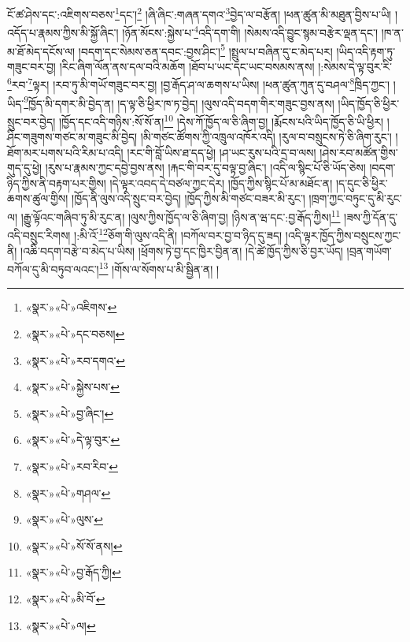 ངོ་ཚ་ཤེས་དང་:འཇིགས་བཅས་\footnote{«སྣར་»«པེ་»འཇིགས་}དང་།\footnote{«སྣར་»«པེ་»དང་བཅས།} །ཞི་ཞིང་:གཞན་དགའ་\footnote{«སྣར་»«པེ་»རབ་དགའ་}བྱེད་ལ་བརྩོན། །ཕན་ཚུན་མི་མཐུན་བྱིས་པ་ཡི། །འདོད་པ་རྣམས་ཀྱིས་མི་སྐྱོ་ཞིང་། །ཉོན་མོངས་:སྐྱེས་པ་\footnote{«སྣར་»«པེ་»སྐྱེས་པས་}འདི་དག་གི། །སེམས་འདི་བྱུང་སྙམ་བརྩེར་ལྡན་དང་། །ཁ་ན་མ་ཐོ་མེད་དངོས་ལ། །བདག་དང་སེམས་ཅན་དབང་:བྱས་ཤིང་།\footnote{«སྣར་»«པེ་»བྱ་ཞིང་།} །སྤྲུལ་པ་བཞིན་དུ་ང་མེད་པར། །ཡིད་འདི་རྟག་ཏུ་གཟུང་བར་བྱ། །རིང་ཞིག་ལོན་ནས་དལ་བའི་མཆོག །ཐོབ་པ་ཡང་དང་ཡང་བསམས་ནས། །:སེམས་དེ་ལྟ་བུར་རི་\footnote{«སྣར་»«པེ་»དེ་ལྟ་བུར་}རབ་\footnote{«སྣར་»«པེ་»རབ་རིབ་}ལྟར། །རབ་ཏུ་མི་གཡོ་གཟུང་བར་བྱ། །བྱ་རྒོད་ཤ་ལ་ཆགས་པ་ཡིས། །ཕན་ཚུན་ཀུན་དུ་བཤལ་\footnote{«སྣར་»«པེ་»གཤལ་}ཁྲིད་ཀྱང་། །ཡིད་\footnote{«སྣར་»«པེ་»ལུས་}ཁྱོད་མི་དགར་མི་བྱེད་ན། །ད་ལྟ་ཅི་ཕྱིར་ཁ་ཏ་བྱེད། །ལུས་འདི་བདག་གིར་གཟུང་བྱས་ནས། །ཡིད་ཁྱོད་ཅི་ཕྱིར་སྲུང་བར་བྱེད། །ཁྱོད་དང་འདི་གཉིས་:སོ་སོ་ན།\footnote{«སྣར་»«པེ་»སོ་སོ་ནས།} །དེས་ཀོ་ཁྱོད་ལ་ཅི་ཞིག་བྱ། །རྨོངས་པའི་ཡིད་ཁྱོད་ཅི་ཡི་ཕྱིར། །ཤིང་གཟུགས་གཙང་མ་གཟུང་མི་བྱེད། །མི་གཙང་ཚོགས་ཀྱི་འཁྲུལ་འཁོར་འདི། །རུལ་བ་བསྲུངས་ཏེ་ཅི་ཞིག་རུང་། །ཐོག་མར་པགས་པའི་རིམ་པ་འདི། །རང་གི་བློ་ཡིས་ཐ་དད་ཕྱེ། །ཤ་ཡང་རུས་པའི་དྲ་བ་ལས། །ཤེས་རབ་མཚོན་གྱིས་གུད་དུ་ཕྱེ། །རུས་པ་རྣམས་ཀྱང་དབྱེ་བྱས་ནས། །རྐང་གི་བར་དུ་བལྟ་བྱ་ཞིང་། །འདི་ལ་སྙིང་པོ་ཅི་ཡོད་ཅེས། །བདག་ཉིད་ཀྱིས་ནི་བརྟག་པར་གྱིས། །དེ་ལྟར་འབད་དེ་བཙལ་ཀྱང་དེར། །ཁྱོད་ཀྱིས་སྙིང་པོ་མ་མཐོང་ན། །ད་དུང་ཅི་ཕྱིར་ཆགས་ཚུལ་གྱིས། །ཁྱོད་ནི་ལུས་འདི་སྲུང་བར་བྱེད། །ཁྱོད་ཀྱིས་མི་གཙང་བཟར་མི་རུང་། །ཁྲག་ཀྱང་བཏུང་དུ་མི་རུང་ལ། །རྒྱུ་ལྟོའང་གཞིབ་ཏུ་མི་རུང་ན། །ལུས་ཀྱིས་ཁྱོད་ལ་ཅི་ཞིག་བྱ། །ཉིས་ན་ཝ་དང་:བྱ་རྒོད་ཀྱིས།\footnote{«སྣར་»«པེ་»བྱ་རྒོད་ཀྱི།} །ཟས་ཀྱི་དོན་དུ་འདི་བསྲུང་རིགས། །:མི་འོ་\footnote{«སྣར་»«པེ་»མི་བོ་}ཅོག་གི་ལུས་འདི་ནི། །བཀོལ་བར་བྱ་བ་ཉིད་དུ་ཟད། །འདི་ལྟར་ཁྱོད་ཀྱིས་བསྲུངས་ཀྱང་ནི། །འཆི་བདག་བརྩེ་བ་མེད་པ་ཡིས། །ཕྲོགས་ཏེ་བྱ་དང་ཁྱིར་བྱིན་ན། །དེ་ཚེ་ཁྱོད་ཀྱིས་ཅི་བྱར་ཡོད། །བྲན་གཡོག་བཀོལ་དུ་མི་བཏུབ་ལའང་།\footnote{«སྣར་»«པེ་»ལ།} །གོས་ལ་སོགས་པ་མི་སྦྱིན་ན། །
